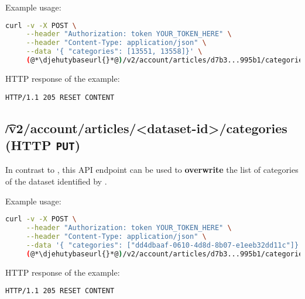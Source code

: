   Example usage:
\begin{lstlisting}[language=bash]
curl -v -X POST \
     --header "Authorization: token YOUR_TOKEN_HERE" \
     --header "Content-Type: application/json" \
     --data '{ "categories": [13551, 13558]}' \
     (@*\djehutybaseurl{}*@)/v2/account/articles/d7b3...995b1/categories
\end{lstlisting}

  HTTP response of the example:
\begin{lstlisting}
HTTP/1.1 205 RESET CONTENT
\end{lstlisting}

\subsection{\t{/v2/account/articles/<dataset-id>/categories} (HTTP \texttt{PUT})}

  In contrast to , this API endpoint
  can be used to \textbf{overwrite} the list of categories of the dataset identified
  by \code{dataset-id}.

  Example usage:
\begin{lstlisting}[language=bash]
curl -v -X POST \
     --header "Authorization: token YOUR_TOKEN_HERE" \
     --header "Content-Type: application/json" \
     --data '{ "categories": ["dd4dbaaf-0610-4d8d-8b07-e1eeb32dd11c"]}' \
     (@*\djehutybaseurl{}*@)/v2/account/articles/d7b3...995b1/categories
\end{lstlisting}

  HTTP response of the example:
\begin{lstlisting}
HTTP/1.1 205 RESET CONTENT
\end{lstlisting}




